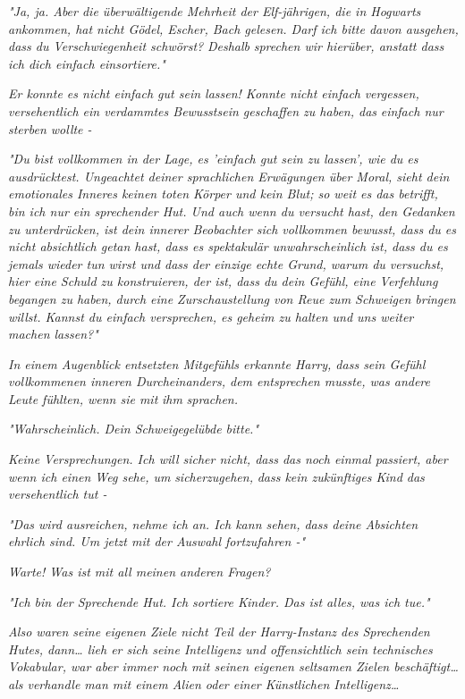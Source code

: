 {\emph{"Ja, ja. Aber die überwältigende Mehrheit der Elf-jährigen, die in Hogwarts ankommen, hat nicht Gödel, Escher, Bach gelesen. Darf ich bitte davon ausgehen, dass du Verschwiegenheit schwörst?} \emph{Deshalb} \emph{\emph{sprechen wir hierüber, anstatt dass ich dich einfach einsortiere."}}

\emph{Er konnte es nicht einfach gut sein lassen! Konnte nicht einfach} \emph{\emph{vergessen,}} \emph{versehentlich ein verdammtes Bewusstsein geschaffen zu haben, das} \emph{einfach nur sterben wollte -}

\emph{\emph{"Du bist vollkommen in der Lage, es 'einfach gut sein zu lassen', wie du es ausdrücktest. Ungeachtet deiner sprachlichen Erwägungen über Moral, sieht dein emotionales Inneres keinen toten Körper und kein Blut; so weit es das betrifft, bin ich nur ein sprechender Hut. Und auch wenn du versucht hast, den Gedanken zu unterdrücken, ist dein innerer Beobachter sich vollkommen bewusst, dass du es nicht absichtlich getan hast, dass es spektakulär unwahrscheinlich ist, dass du es jemals wieder tun wirst und dass der einzige echte Grund, warum du versuchst, hier eine Schuld zu konstruieren, der ist, dass du dein Gefühl, eine Verfehlung begangen zu haben, durch eine Zurschaustellung von Reue zum Schweigen bringen willst. Kannst du einfach versprechen, es geheim zu halten und uns weiter machen lassen?"}}

\emph{In einem Augenblick entsetzten Mitgefühls erkannte Harry, dass sein Gefühl vollkommenen inneren Durcheinanders, dem entsprechen musste, was andere Leute fühlten, wenn sie mit} \emph{\emph{ihm}} \emph{sprachen.}

\emph{"Wahrscheinlich. Dein Schweigegelübde bitte."}

\emph{Keine Versprechungen. Ich will sicher nicht, dass das noch einmal passiert, aber wenn ich einen Weg sehe, um} \emph{sicherzugehen,} \emph{\emph{dass kein zukünftiges Kind das versehentlich tut -}}

\emph{"Das wird ausreichen, nehme ich an. Ich kann sehen, dass deine Absichten ehrlich sind. Um jetzt mit der Auswahl fortzufahren -"}

\emph{Warte! Was ist mit all meinen anderen Fragen?}

\emph{"Ich bin der Sprechende Hut. Ich sortiere Kinder. Das ist alles, was ich tue."}

\emph{Also waren seine eigenen Ziele nicht Teil der Harry-Instanz des Sprechenden Hutes, dann… lieh er sich seine Intelligenz und offensichtlich sein technisches Vokabular, war aber immer noch mit seinen eigenen seltsamen Zielen beschäftigt… als verhandle man mit einem Alien oder einer Künstlichen Intelligenz…}

}
